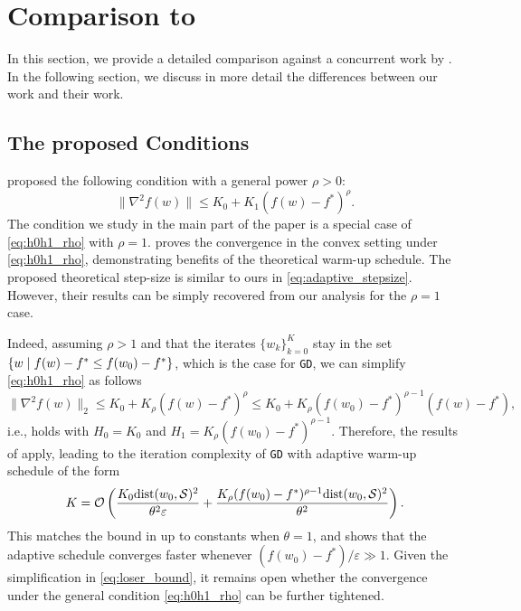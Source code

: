 \documentclass[a4paper,11pt]{article}
\newcommand{\algname}[1]{\texttt{#1}}
\newcommand{\cS}{\mathcal{S}}
\newcommand{\cO}{\mathcal O}
\newif\ifappendix
\newcommand{\1}{\mathbbm{1}}
\theoremstyle{plain}
\begin{document}
\newcommand\invisiblepart[1]{%
  \refstepcounter{part}%
  \addcontentsline{toc}{part}{\protect\numberline{\thepart}#1}%
}


\invisiblepart{Appendix}
\setcounter{tocdepth}{2}
\localtableofcontents


\appendixtrue




\section{Comparison to \citet{liu2025theoretical}}\label{sec:concurrent_work}



In this section, we provide a detailed comparison against a concurrent work by \citet{liu2025theoretical}. In the following section, we discuss in more detail the differences between our work and their work. 

\subsection{The proposed Conditions}

\citet{liu2025theoretical} proposed the following condition with a general power $\rho > 0$:
\begin{equation}\label{eq:h0h1_rho}
\|\nabla^2f(w)\| \le K_0 + K_{1}(f(w)-f^*)^\rho.
\end{equation}
The condition we study in the main part of the paper is a special case of \eqref{eq:h0h1_rho} with $\rho=1$. \citet{liu2025theoretical} proves the convergence in the convex setting under \eqref{eq:h0h1_rho}, demonstrating benefits of the theoretical warm-up schedule. The proposed theoretical step-size is similar to ours in \eqref{eq:adaptive_stepsize}. However, their results can be simply recovered from our analysis for the $\rho=1$ case.

Indeed, assuming $\rho >1$ and that the iterates $\{w_k\}_{k=0}^{K}$ stay in the set $\{w \hspace{1mm} | \hspace{1mm} f(w)-f^* \le f(w_0)-f^*\}$, which is the case for \algname{GD}, we can simplify \eqref{eq:h0h1_rho} as follows 
\begin{equation}\label{eq:loser_bound}
\|\nabla^2f(w)\|_2 \le K_0 + K_\rho(f(w)-f^*)^\rho \le K_0 + K_\rho(f(w_0)-f^*)^{\rho-1}(f(w)-f^*),
\end{equation}
i.e.,  holds with $H_0 = K_0$ and $H_1 = K_\rho(f(w_0)-f^*)^{\rho-1}.$ Therefore, the results of  apply, leading to the iteration complexity of \algname{GD} with adaptive warm-up schedule of the form
\[
K = \cO\left(\frac{K_0{\rm dist}(w_0,\cS)^2}{\theta^2\varepsilon} + \frac{K_\rho(f(w_0)-f^*)^{\rho-1}{\rm dist}(w_0,\cS)^2}{\theta^2}\right).
\]
This matches the bound in \citet{liu2025theoretical} up to constants when $\theta=1$, and shows that the adaptive schedule converges faster whenever $(f(w_0)-f^*)/\varepsilon \gg 1$. Given the simplification in \eqref{eq:loser_bound}, it remains open whether the convergence under the general condition \eqref{eq:h0h1_rho} can be further tightened.
\end{document}
